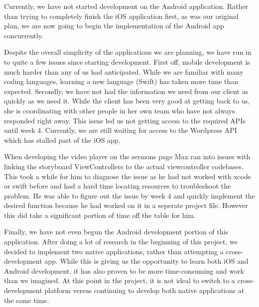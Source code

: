 \documentclass[letterpaper,10pt,draftclsnofoot,onecolumn,titlepage]{IEEEtran}
\begin{document}
		Currently, we have not started development on the Android application. 
		Rather than trying to completely finish the iOS application first, as was our original plan, we are now going to begin the implementation of the Android app concurrently. 
		
		Despite the overall simplicity of the applications we are planning, we have run in to quite a few issues since starting development. 
		First off, mobile development is much harder than any of us had anticipated. 
		While we are familiar with many coding languages, learning a new language (Swift) has taken more time than expected. 
		Secondly, we have not had the information we need from our client as quickly as we need it. 
		While the client has been very good at getting back to us, she is coordinating with other people in her own team who have not always responded right away. 
		This issue led us not getting access to the required APIs until week 4. 
		Currently, we are still waiting for access to the Wordpress API which has stalled part of the iOS app. 
		
		When developing the video player on the sermons page Max ran into issues with linking the storyboard ViewControllers to the actual viewcontroller codebases. 
		This took a while for him to diagnose the issue as he had not worked with xcode or swift before and had a hard time locating resources to troubleshoot the problem. 
		He was able to figure out the issue by week 4 and quickly implement the desired function because he had worked on it in a seperate project file.
		However this did take a significant portion of time off the table for him.
		
		Finally, we have not even begun the Android development portion of this application. 
		After doing a lot of research in the beginning of this project, we decided to implement two native applications, rather than attempting a cross-development app. 
		While this is giving us the opportunity to learn both iOS and Android development, it has also proven to be more time-consuming and work than we imagined. 
		At this point in the project, it is not ideal to switch to a cross-development platform versus continuing to develop both native applications at the same time.
\end{document}

